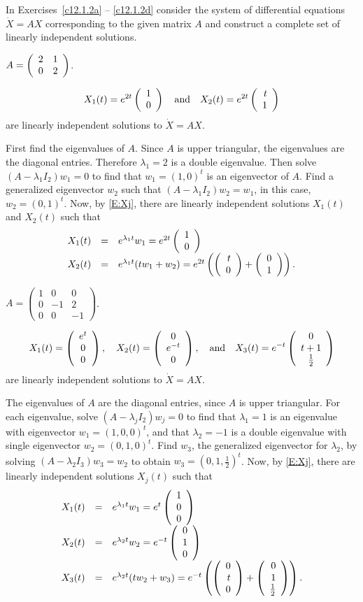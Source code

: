 \documentclass{ximera}
\begin{document}
\TEXER

\noindent  In Exercises~\ref{c12.1.2a} -- \ref{c12.1.2d} consider the system 
of differential equations $\dot X = AX$ corresponding to the given matrix 
$A$ and construct a complete set of linearly independent solutions.
\begin{exercise} \label{c12.1.2a}
$A=\left(\begin{array}{rr} 2 & 1\\ 0 &2\end{array}\right)$.

\begin{solution}
\ans
\[
X_1(t) = e^{2t}\left(\begin{array}{r} 1 \\ 0\end{array}\right) \quad\mbox{and}\quad
X_2(t) = e^{2t}\left(\begin{array}{r} t \\ 1\end{array}\right)
\]
are linearly independent solutions to $\dot{X} = AX$.

\soln First find the eigenvalues of $A$.  Since $A$ is upper triangular,
the eigenvalues are the diagonal entries.  Therefore $\lambda_1 = 2$
is a double eigenvalue.  Then solve $(A - \lambda_1 I_2)w_1 = 0$ to
find that $w_1 = (1,0)^t$ is an eigenvector of $A$.  Find a
generalized eigenvector $w_2$ such that $(A - \lambda_1 I_2)w_2 =
w_1$, in this case, $w_2 = (0,1)^t$.  Now, by \eqref{E:Xj},
there are linearly independent solutions $X_1(t)$ and $X_2(t)$ such that
\[
\begin{array}{rcl}
X_1(t) & = & e^{\lambda_1 t}w_1 = e^{2t}\left(\begin{array}{r} 1 \\ 0\end{array}\right) \\ X_2(t) & = &
e^{\lambda_1 t}(tw_1 + w_2) = e^{2t}\left(\left(\begin{array}{r} t \\ 0\end{array}\right) +
\left(\begin{array}{r} 0 \\ 1\end{array}\right)\right).
\end{array}
\]

\end{solution}
\end{exercise}
\begin{exercise} \label{c12.1.2b}
$A=\left(\begin{array}{rrr} 1 & 0 & 0\\ 0 & -1 & 2 \\ 0 & 0 & -1
\end{array}\right)$.

\begin{solution}
\ans
\[
X_1(t) = \left(\begin{array}{c} e^t \\ 0 \\ 0\end{array}\right), \quad
X_2(t) = \left(\begin{array}{c} 0 \\ e^{-t} \\ 0\end{array}\right), \quad\mbox{and}\quad
X_3(t) = e^{-t}\left(\begin{array}{c} 0 \\ t + 1 \\ \frac{1}{2}\end{array}\right)
\]
are linearly independent solutions to $\dot{X} = AX$.

\soln The eigenvalues of $A$ are the diagonal entries, since $A$ is upper
triangular.  For each eigenvalue, solve $(A - \lambda_j I_2)w_j = 0$
to find that $\lambda_1 = 1$ is an eigenvalue with eigenvector $w_1 =
(1,0,0)^t$, and that $\lambda_2 = -1$ is a double eigenvalue with
single eigenvector $w_2 = (0,1,0)^t$.  Find $w_3$, the generalized
eigenvector for $\lambda_2$, by solving $(A - \lambda_2 I_3)w_3 = w_2$
to obtain $w_3 = (0,1,\frac{1}{2})^t$.  Now, by \eqref{E:Xj},
there are linearly independent solutions $X_j(t)$ such that
\[
\begin{array}{rcl}
X_1(t) & = & e^{\lambda_1 t}w_1 = e^t\left(\begin{array}{r} 1 \\ 0 \\ 0\end{array}\right) \\
X_2(t) & = & e^{\lambda_2 t}w_2 = e^{-t}\left(\begin{array}{r} 0 \\ 1 \\ 0\end{array}\right) \\
X_3(t) & = & e^{\lambda_2 t}(tw_2 + w_3) = e^{-t}\left(\left(\begin{array}{r} 0 \\ t \\ 0\end{array}\right)
+ \left(\begin{array}{r} 0 \\ 1 \\ \frac{1}{2}\end{array}\right)\right).
\end{array}
\]

\end{solution}
\end{exercise}
\end{document}
